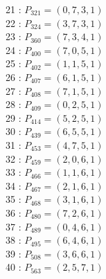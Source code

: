 \documentclass{article}
\begin{document}
{\begin{multicols}{2}
21 : $P_{321}=( 0, 7, 3, 1 )$\\
22 : $P_{324}=( 3, 7, 3, 1 )$\\
23 : $P_{360}=( 7, 3, 4, 1 )$\\
24 : $P_{400}=( 7, 0, 5, 1 )$\\
25 : $P_{402}=( 1, 1, 5, 1 )$\\
26 : $P_{407}=( 6, 1, 5, 1 )$\\
27 : $P_{408}=( 7, 1, 5, 1 )$\\
28 : $P_{409}=( 0, 2, 5, 1 )$\\
29 : $P_{414}=( 5, 2, 5, 1 )$\\
30 : $P_{439}=( 6, 5, 5, 1 )$\\
31 : $P_{453}=( 4, 7, 5, 1 )$\\
32 : $P_{459}=( 2, 0, 6, 1 )$\\
33 : $P_{466}=( 1, 1, 6, 1 )$\\
34 : $P_{467}=( 2, 1, 6, 1 )$\\
35 : $P_{468}=( 3, 1, 6, 1 )$\\
36 : $P_{480}=( 7, 2, 6, 1 )$\\
37 : $P_{489}=( 0, 4, 6, 1 )$\\
38 : $P_{495}=( 6, 4, 6, 1 )$\\
39 : $P_{508}=( 3, 6, 6, 1 )$\\
40 : $P_{563}=( 2, 5, 7, 1 )$\\
\end{multicols}
}
\end{document}
